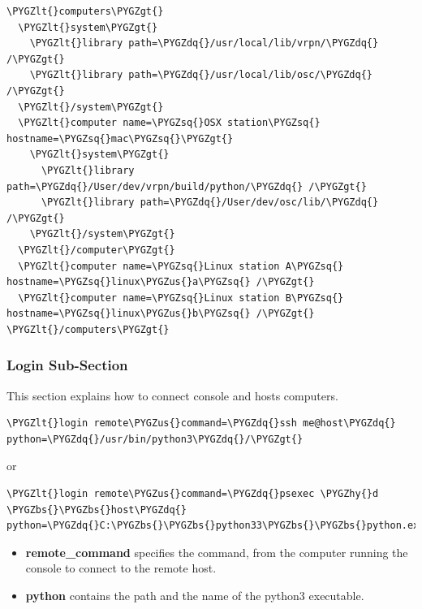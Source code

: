 \documentclass[a4,10pt,openany,oneside]{sphinxmanual}
\def\PYGZbs{\char`\\}
\def\PYGZus{\char`\_}
\def\PYGZlt{\char`\<}
\def\PYGZgt{\char`\>}
\def\PYGZhy{\char`\-}
\def\PYGZsq{\char`\'}
\def\PYGZdq{\char`\"}
\begin{document}
\begin{Verbatim}[commandchars=\\\{\}]
\PYGZlt{}computers\PYGZgt{}
  \PYGZlt{}system\PYGZgt{}
    \PYGZlt{}library path=\PYGZdq{}/usr/local/lib/vrpn/\PYGZdq{} /\PYGZgt{}
    \PYGZlt{}library path=\PYGZdq{}/usr/local/lib/osc/\PYGZdq{} /\PYGZgt{}
  \PYGZlt{}/system\PYGZgt{}
  \PYGZlt{}computer name=\PYGZsq{}OSX station\PYGZsq{} hostname=\PYGZsq{}mac\PYGZsq{}\PYGZgt{}
    \PYGZlt{}system\PYGZgt{}
      \PYGZlt{}library path=\PYGZdq{}/User/dev/vrpn/build/python/\PYGZdq{} /\PYGZgt{}
      \PYGZlt{}library path=\PYGZdq{}/User/dev/osc/lib/\PYGZdq{} /\PYGZgt{}
    \PYGZlt{}/system\PYGZgt{}
  \PYGZlt{}/computer\PYGZgt{}
  \PYGZlt{}computer name=\PYGZsq{}Linux station A\PYGZsq{} hostname=\PYGZsq{}linux\PYGZus{}a\PYGZsq{} /\PYGZgt{}
  \PYGZlt{}computer name=\PYGZsq{}Linux station B\PYGZsq{} hostname=\PYGZsq{}linux\PYGZus{}b\PYGZsq{} /\PYGZgt{}
\PYGZlt{}/computers\PYGZgt{}
\end{Verbatim}


\subsubsection{Login Sub-Section}
\label{components/configuration-file:login-sub-section}
This section explains how to connect console and hosts computers.

\begin{Verbatim}[commandchars=\\\{\}]
\PYGZlt{}login remote\PYGZus{}command=\PYGZdq{}ssh me@host\PYGZdq{} python=\PYGZdq{}/usr/bin/python3\PYGZdq{}/\PYGZgt{}
\end{Verbatim}

or

\begin{Verbatim}[commandchars=\\\{\}]
\PYGZlt{}login remote\PYGZus{}command=\PYGZdq{}psexec \PYGZhy{}d \PYGZbs{}\PYGZbs{}host\PYGZdq{} python=\PYGZdq{}C:\PYGZbs{}\PYGZbs{}python33\PYGZbs{}\PYGZbs{}python.exe\PYGZdq{}/\PYGZgt{}
\end{Verbatim}
\begin{itemize}
\item {} 
\textbf{remote\_command} specifies the command, from the computer running the console to connect to the remote host.

\item {} 
\textbf{python} contains the path and the name of the python3 executable.

\end{itemize}
\end{document}
